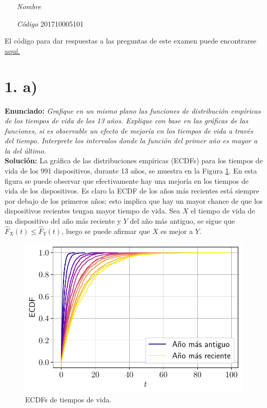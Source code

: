 \documentclass[fleqn]{article}
\begin{document}
 \vspace{0.3cm}
   \begin{itemize}[leftmargin=6.25cm, labelsep=0.5cm]

     \item[\textit{Nombre}]  %
     \item[\textit{Código}] 201710005101 %

   \end{itemize}
\vspace{0.3cm}
El código para dar respuestas a las preguntas de este examen puede encontrarse \href{https://github.com/Daples/daples/blob/master/nps/code-exam.ipynb}{aquí.}
\section*{1. a)}
\textbf{Enunciado:} \textit{Grafique en un mismo plano las funciones de distribución empíricas de los tiempos de vida de los 13 años. Explique con base en las gráficas de las funciones, si es observable un efecto de mejoría en los tiempos de vida a través del tiempo. Interprete los intervalos donde la función del primer año es mayor a la del último.}\\
\textbf{Solución:} La gráfica de las distribuciones empíricas (ECDFs) para los tiempos de vida de los 991 dispositivos, durante 13 años, se muestra en la Figura \ref{fig:1a}. En esta figura se puede observar que efectivamente hay una mejoría en los tiempos de vida de los dispositivos. Es claro la ECDF de los años más recientes está siempre por debajo de los primeros años; esto implica que hay un mayor chance de que los dispositivos recientes tengan mayor tiempo de vida. Sea $X$ el tiempo de vida de un dispositivo del año más reciente y $Y$ del año más antiguo, se sigue que $\hat{F}_X(t)\leq\hat{F}_Y(t)$, luego se puede afirmar que $X$ es mejor a $Y$.
\begin{figure}[H]
    \centering
    \includegraphics[scale=.6]{1a.pdf}
    \caption{ECDFs de tiempos de vida.}
    \label{fig:1a}
\end{figure}
\end{document}
